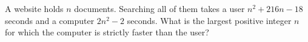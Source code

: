 A website holds $n$ documents. Searching all of them takes a user $n^2+216n-18$ seconds and a computer $2n^2-2$ seconds. What is the largest positive integer $n$ for which the computer is strictly faster than the user?
